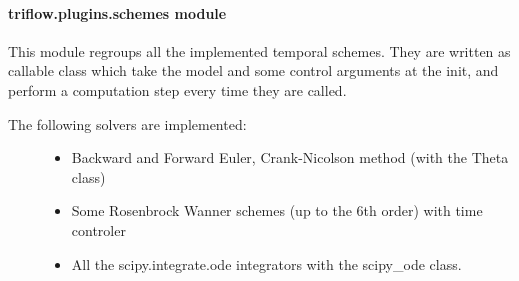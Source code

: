 \documentclass[letterpaper,10pt,english]{sphinxmanual}
\begin{document}
\paragraph{triflow.plugins.schemes module}
\label{\detokenize{triflow.plugins:triflow-plugins-schemes-module}}\label{\detokenize{triflow.plugins:module-triflow.plugins.schemes}}
This module regroups all the implemented temporal schemes.
They are written as callable class which take the model and some control
arguments at the init, and perform a computation step every time they are
called.
\begin{description}
\item[{The following solvers are implemented:}] \leavevmode\begin{itemize}
\item {} 
Backward and Forward Euler, Crank-Nicolson method (with the Theta class)

\item {} 
Some Rosenbrock Wanner schemes (up to the 6th order) with time controler

\item {} 
All the scipy.integrate.ode integrators with the scipy\_ode class.

\end{itemize}

\end{description}
\end{document}
